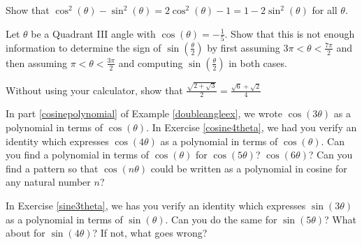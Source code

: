 \documentclass{ximera}
\begin{document}
\begin{problem}
Show that $\cos^{2}(\theta) - \sin^{2}(\theta) = 2\cos^{2}(\theta) - 1 = 1 - 2\sin^{2}(\theta)$ for all $\theta$.
\end{problem}

\begin{problem}
Let $\theta$ be a Quadrant III angle with $\cos(\theta) = -\frac{1}{5}$.  Show that this is not enough information to determine the sign of  $\sin\left(\frac{\theta}{2}\right)$ by first assuming $3\pi < \theta < \frac{7\pi}{2}$ and then assuming $\pi < \theta < \frac{3\pi}{2}$ and computing $\sin\left(\frac{\theta}{2}\right)$ in both cases.
\end{problem}

\begin{problem}
Without using your calculator, show that $\frac{\sqrt{2 + \sqrt{3}}}{2} = \frac{\sqrt{6} + \sqrt{2}}{4}$
\end{problem}

\begin{problem}
In part \ref{cosinepolynomial} of Example \ref{doubleangleex}, we wrote $\cos(3\theta)$ as a polynomial in terms of $\cos(\theta)$.  In Exercise \ref{cosine4theta}, we had you verify an identity which expresses $\cos(4\theta)$ as a polynomial in terms of $\cos(\theta)$.   Can you find a polynomial in terms of $\cos(\theta)$ for $\cos(5\theta)$?  $\cos(6\theta)$?  Can you find a pattern so that $\cos(n\theta)$ could be written as a polynomial in cosine for any natural number $n$?
\end{problem}

\begin{problem}
In Exercise \ref{sine3theta}, we has you verify an identity which expresses $\sin(3\theta)$ as a polynomial in terms of $\sin(\theta)$.   Can you do the same for  $\sin(5\theta)$?  What about for $\sin(4\theta)$?  If not, what goes wrong?
\end{problem}
\end{document}
